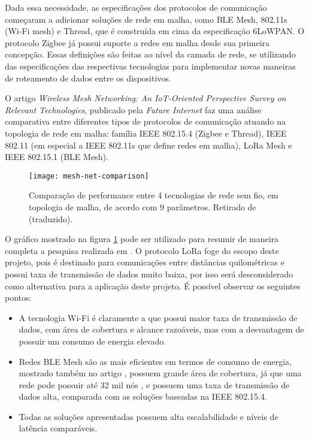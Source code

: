 \documentclass[../monografia.tex]{subfiles}
\begin{document}

Dada essa necessidade, as especificações dos protocolos de comunicação começaram a adicionar soluções de rede em malha, como BLE Mesh, 802.11s (Wi-Fi mesh) e Thread, que é construída em cima da especificação 6LoWPAN. O protocolo Zigbee já possui suporte a redes em malha desde sua primeira concepção. Essas definições são feitas ao nível da camada de rede, se utilizando das especificações das respectivas tecnologias para implementar novas maneiras de roteamento de dados entre os dispositivos.

O artigo \textit{Wireless Mesh Networking: An IoT-Oriented Perspective Survey on Relevant Technologies}, publicado pela \textit{Future Internet} \cite{mesh-net-comparison} faz uma análise comparativa entre diferentes tipos de protocolos de comunicação atuando na topologia de rede em malha: família IEEE 802.15.4 (Zigbee e Thread), IEEE 802.11 (em especial a IEEE 802.11s que define redes em malha), LoRa Mesh e IEEE 802.15.1 (BLE Mesh).

\begin{figure}[h!]
\centering
	\texttt{[image: mesh-net-comparison]}
	\caption{
		Comparação de performance entre 4 tecnologias de rede sem fio, em topologia de malha, de acordo com 9 parâmetros. Retirado de \cite{mesh-net-comparison} (traduzido).
	}
	\label{fig:Comparação redes mesh}
\end{figure}

O gráfico mostrado na figura \ref{fig:Comparação redes mesh} pode ser utilizado para resumir de maneira completa a pesquisa realizada em \cite{mesh-net-comparison}. O protocolo LoRa foge do escopo deste projeto, pois é destinado para comunicações entre distâncias quilométricas e possui taxa de transmissão de dados muito baixa, por isso será desconsiderado como alternativa para a aplicação deste projeto. É possível observar os seguintes pontos:

\begin{itemize}
	\item A tecnologia Wi-Fi é claramente a que possui maior taxa de transmissão de dados, com área de cobertura e alcance razoáveis, mas com a desvantagem de possuir um consumo de energia elevado.
	\item Redes BLE Mesh são as mais eficientes em termos de consumo de energia, mostrado também no artigo \cite{zigbee-ble-power}, possuem grande área de cobertura, já que uma rede pode possuir até 32 mil nós \cite{BLE-mesh}, e possuem uma taxa de transmissão de dados alta, comparada com as soluções baseadas na IEEE 802.15.4.
	\item Todas as soluções apresentadas possuem alta escalabilidade e níveis de latência comparáveis.
\end{itemize}
\end{document}
